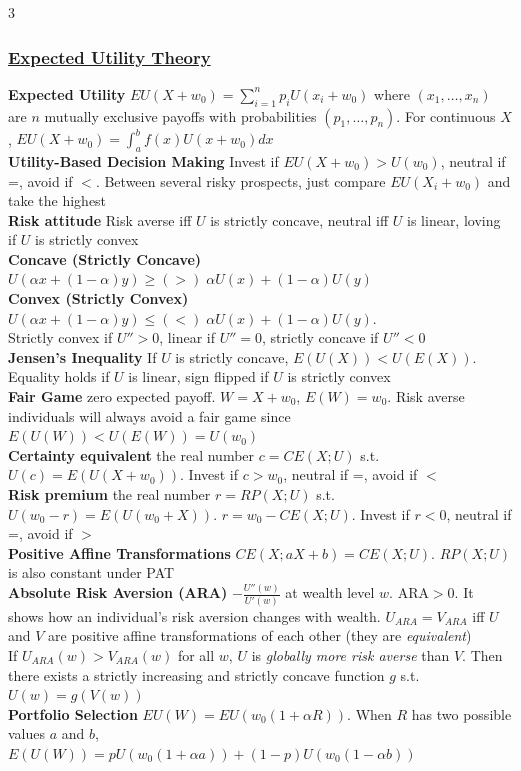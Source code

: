 \documentclass{article}
\begin{document}
{\begin{multicols*}{3}
\subsubsection*{\underline{Expected Utility Theory}}
\textbf{Expected Utility} $EU(X+w_0)=\sum_{i=1}^np_iU(x_i+w_0)$ where $(x_1,\dots,x_n)$ are $n$ mutually exclusive payoffs with probabilities $(p_1,\dots,p_n)$. For continuous $X$, $EU(X+w_0)=\int_a^bf(x)U(x+w_0)dx$\\
\textbf{Utility-Based Decision Making} Invest if $EU(X+w_0)>U(w_0)$, neutral if =, avoid if $<$. Between several risky prospects, just compare $EU(X_i+w_0)$ and take the highest\\
\textbf{Risk attitude} Risk averse iff $U$ is strictly concave, neutral iff $U$ is linear, loving if $U$ is strictly convex\\
\textbf{Concave (Strictly Concave)} $U(\alpha x+(1-\alpha)y)\geq(>)\;\alpha U(x)+(1-\alpha)U(y)$ \\
\textbf{Convex (Strictly Convex)} $U(\alpha x+(1-\alpha)y)\leq(<)\;\alpha U(x)+(1-\alpha)U(y)$. \\
Strictly convex if $U''>0$, linear if $U''=0$, strictly concave if $U''<0$\\
\textbf{Jensen’s Inequality} If $U$ is strictly concave, $E(U(X))<U(E(X))$. Equality holds if $U$ is linear, sign flipped if $U$ is strictly convex\\
\textbf{Fair Game} zero expected payoff. $W=X+w_0$, $E(W)=w_0$. Risk
averse individuals will always avoid a fair game since $E(U(W))<U(E(W))=U(w_0)$\\
\textbf{Certainty equivalent} the real number $c=CE(X;U)$ s.t. $U(c)=E(U(X+w_0))$. Invest if $c>w_0$, neutral if =, avoid if $<$\\
\textbf{Risk premium} the real number $r=RP(X;U)$ s.t. $U(w_0-r)=E(U(w_0+X))$. $r=w_0-CE(X;U)$. Invest if $r<0$, neutral if =, avoid if $>$\\
\textbf{Positive Affine Transformations} $CE(X;aX+b)=CE(X;U)$. $RP(X;U)$ is also constant under PAT\\
\textbf{Absolute Risk Aversion (ARA)} $-\frac{U''(w)}{U'(w)}$ at wealth level $w$. ARA$>0$. It shows how an individual’s risk aversion changes with wealth. $U_{ARA}=V_{ARA}$ iff $U$ and $V$ are positive affine transformations
of each other (they are \textit{equivalent})\\
If $U_{ARA}(w)>V_{ARA}(w)$ for all $w$, $U$ is \textit{globally more risk averse} than $V$. Then there exists a strictly increasing and strictly concave function $g$ s.t. $U(w)=g(V(w))$\\
\textbf{Portfolio Selection} $EU(W)=EU(w_0(1+\alpha R))$. When $R$ has two possible values $a$ and $b$, $E(U(W))=pU(w_0(1+\alpha a))+(1-p)U(w_0(1-\alpha b))$


\end{multicols*}}
\end{document}

